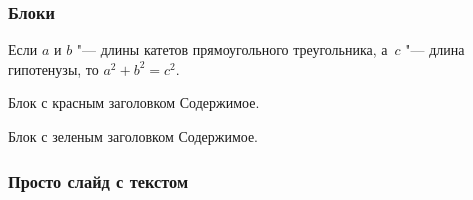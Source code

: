 \documentclass[aspectratio=169]{beamer}
\begin{document}
\begin{frame}
\frametitle{Блоки}
	\begin{theorem}[Пифагора]
		Если $a$ и $b$ "--- длины катетов прямоугольного треугольника, а~$c$ "--- длина гипотенузы, то $a^2+b^2=c^2$.
	\end{theorem}

	\begin{alertblock}{Блок с красным заголовком}
		Содержимое.
	\end{alertblock}

	\begin{exampleblock}{Блок с зеленым заголовком}
		Содержимое.
	\end{exampleblock}
\end{frame}

\begin{frame}
\frametitle{Просто слайд с текстом}
\end{frame}
\end{document}
